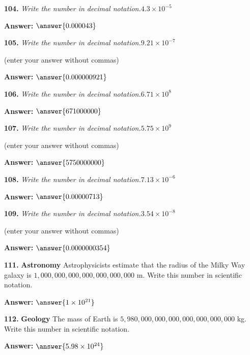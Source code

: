 \documentclass{ximera}
\begin{document}
\begin{problem}
\textbf{104.} \emph{Write the number in decimal notation.}\quad $4.3 \times 10^{-5}$

\textbf{Answer:} $\answer{0.000043}$
\end{problem}

\begin{problem}
\textbf{105.} \emph{Write the number in decimal notation.}\quad $9.21 \times 10^{-7}$

(enter your answer without commas)

\textbf{Answer:} $\answer{0.000000921}$
\end{problem}

\begin{problem}
\textbf{106.} \emph{Write the number in decimal notation.}\quad $6.71 \times 10^8$

\textbf{Answer:} $\answer{671000000}$
\end{problem}

\begin{problem}
\textbf{107.} \emph{Write the number in decimal notation.}\quad $5.75 \times 10^9$

(enter your answer without commas)

\textbf{Answer:} $\answer{5750000000}$
\end{problem}

\begin{problem}
\textbf{108.} \emph{Write the number in decimal notation.}\quad $7.13 \times 10^{-6}$

\textbf{Answer:} $\answer{0.00000713}$
\end{problem}

\begin{problem}
\textbf{109.} \emph{Write the number in decimal notation.}\quad $3.54 \times 10^{-8}$

(enter your answer without commas)

\textbf{Answer:} $\answer{0.0000000354}$
\end{problem}

\begin{problem}
\textbf{111.} \textbf{Astronomy} Astrophysicists estimate that the radius of the Milky Way
  galaxy is $1{,}000{,}000{,}000{,}000{,}000{,}000{,}000$ m. Write this number in
  scientific notation.

\textbf{Answer:} $\answer{1\times 10^{21}}$
\end{problem}

\begin{problem}
\textbf{112.} \textbf{Geology} The mass of Earth is
  $5{,}980{,}000{,}000{,}000{,}000{,}000{,}000{,}000$ kg. Write this number in scientific
  notation.

\textbf{Answer:} $\answer{5.98 \times 10^{24}}$
\end{problem}
\end{document}
